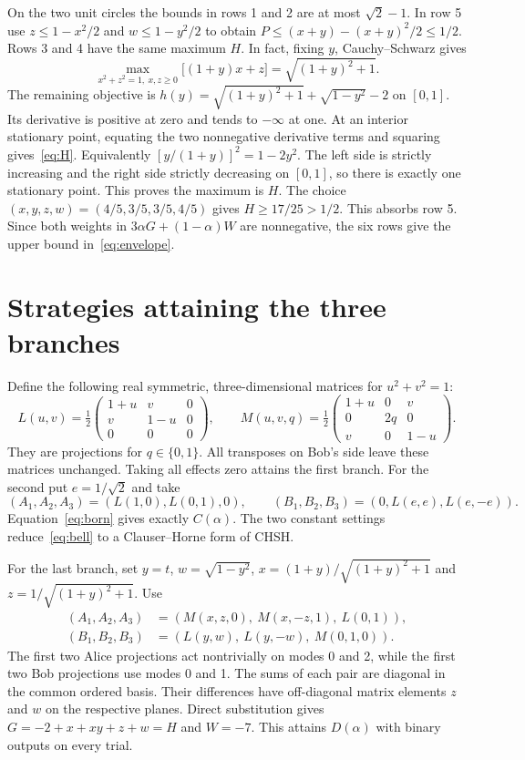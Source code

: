 \documentclass[11pt]{article}
\begin{document}
On the two unit circles the bounds in rows 1 and 2 are at most $\sqrt2-1$. In row 5 use $z\le1-x^2/2$ and $w\le1-y^2/2$ to obtain $P\le (x+y)-(x+y)^2/2\le1/2$. Rows 3 and 4 have the same maximum $H$. In fact, fixing $y$, Cauchy--Schwarz gives
\[
 \max_{x^2+z^2=1,\ x,z\ge0}\big[(1+y)x+z\big]=\sqrt{(1+y)^2+1}.
\]
The remaining objective is $h(y)=\sqrt{(1+y)^2+1}+\sqrt{1-y^2}-2$ on $[0,1]$. Its derivative is positive at zero and tends to $-\infty$ at one. At an interior stationary point, equating the two nonnegative derivative terms and squaring gives~\eqref{eq:H}. Equivalently $[y/(1+y)]^2=1-2y^2$. The left side is strictly increasing and the right side strictly decreasing on $[0,1]$, so there is exactly one stationary point. This proves the maximum is $H$. The choice $(x,y,z,w)=(4/5,3/5,3/5,4/5)$ gives $H\ge17/25>1/2$. This absorbs row 5. Since both weights in $3\alpha G+(1-\alpha)W$ are nonnegative, the six rows give the upper bound in~\eqref{eq:envelope}.

\section{Strategies attaining the three branches}
Define the following real symmetric, three-dimensional matrices for $u^2+v^2=1$:
\[
 L(u,v)=\tfrac12\begin{pmatrix}1+u&v&0\\v&1-u&0\\0&0&0\end{pmatrix},
 \qquad
 M(u,v,q)=\tfrac12\begin{pmatrix}1+u&0&v\\0&2q&0\\v&0&1-u\end{pmatrix}.
\]
They are projections for $q\in\{0,1\}$. All transposes on Bob's side leave these matrices unchanged. Taking all effects zero attains the first branch. For the second put $e=1/\sqrt2$ and take
\[
 (A_1,A_2,A_3)=(L(1,0),L(0,1),0),\qquad
 (B_1,B_2,B_3)=(0,L(e,e),L(e,-e)).
\]
Equation~\eqref{eq:born} gives exactly $C(\alpha)$. The two constant settings reduce~\eqref{eq:bell} to a Clauser--Horne form of CHSH.

For the last branch, set $y=t$, $w=\sqrt{1-y^2}$, $x=(1+y)/\sqrt{(1+y)^2+1}$ and $z=1/\sqrt{(1+y)^2+1}$. Use
\begin{align*}
 (A_1,A_2,A_3)&=(M(x,z,0),\ M(x,-z,1),\ L(0,1)),\\
 (B_1,B_2,B_3)&=(L(y,w),\ L(y,-w),\ M(0,1,0)).
\end{align*}
The first two Alice projections act nontrivially on modes 0 and 2, while the first two Bob projections use modes 0 and 1. The sums of each pair are diagonal in the common ordered basis. Their differences have off-diagonal matrix elements $z$ and $w$ on the respective planes. Direct substitution gives $G=-2+x+xy+z+w=H$ and $W=-7$. This attains $D(\alpha)$ with binary outputs on every trial.
\end{document}
